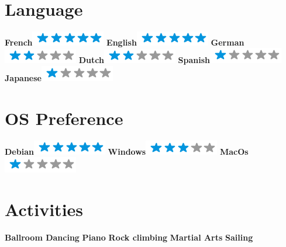 \begin{aside}
  ~
  \makecvsideheader%
  \section{Language}
    \textbf{French}\includegraphics[scale=0.40]{img/5stars.png}
    \textbf{English}\includegraphics[scale=0.40]{img/5stars.png}
    \textbf{German}\includegraphics[scale=0.40]{img/2stars.png}
    \textbf{Dutch}\includegraphics[scale=0.40]{img/2stars.png}
    \textbf{Spanish}\includegraphics[scale=0.40]{img/1stars.png}
    \textbf{Japanese}\includegraphics[scale=0.40]{img/1stars.png}
  ~
  \section{OS Preference}
    \textbf{Debian}\includegraphics[scale=0.40]{img/5stars.png}
    \textbf{Windows}\includegraphics[scale=0.40]{img/3stars.png}
    \textbf{MacOs}\includegraphics[scale=0.40]{img/1stars.png}
  ~
  \section{Activities}
    \textbf{Ballroom Dancing}
    \textbf{Piano}
    \textbf{Rock climbing}
    \textbf{Martial Arts}
    \textbf{Sailing}
\end{aside}
